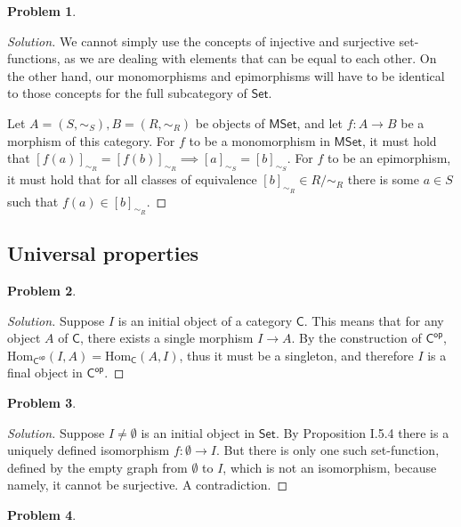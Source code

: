 \documentclass{article}
\theoremstyle{definition}
\newtheorem{problem-internal}{Problem}[subsection]
\newenvironment{problem}{
	\medskip
	\begin{problem-internal}
	}{
\end{problem-internal}
}
\newenvironment{solution}{
	\begin{proof}[Solution]
		\vspace{-8px}
		\setlength{\parskip}{4px}
		\setlength{\parindent}{0px}
	}{
\end{proof}
}
\newcommand{\Hom}{\mathrm{Hom}}
\newcommand{\C}{\mathsf{C}}
\newcommand{\Cop}{\mathsf{C^{op}}}
\newcommand{\Cset}{\mathsf{Set}}
\begin{document}
\begin{problem}
\end{problem}

\begin{solution}
	We cannot simply use the concepts of injective and surjective set-functions, as we are dealing with elements that can be equal to each other. On the other hand, our monomorphisms and epimorphisms will have to be identical to those concepts for the full subcategory of $\Cset$.
	
	Let $A = (S, \sim_S), B = (R, \sim_R)$ be objects of $\mathsf{MSet}$, and let $f: A \to B$ be a morphism of this category. For $f$ to be a monomorphism in $\mathsf{MSet}$, it must hold that $[f(a)]_{\sim_R} = [f(b)]_{\sim_R} \implies [a]_{\sim_S} = [b]_{\sim_S}$. For $f$ to be an epimorphism, it must hold that for all classes of equivalence $[b]_{\sim_R} \in R/\sim_R$ there is some $a \in S$ such that $f(a) \in [b]_{\sim_R}$.
\end{solution}

\subsection{Universal properties}

\begin{problem}
\end{problem}

\begin{solution}
	Suppose $I$ is an initial object of a category $\C$. This means that for any object $A$ of $\C$, there exists a single morphism $I \to A$. By the construction of $\Cop$, $\Hom_{\Cop}(I,A) = \Hom_{\C}(A,I)$, thus it must be a singleton, and therefore $I$ is a final object in $\Cop$.
\end{solution}

\begin{problem}
\end{problem}

\begin{solution}
	Suppose $I \neq \emptyset$ is an initial object in $\Cset$. By Proposition I.5.4 there is a uniquely defined isomorphism $f: \emptyset \to I$. But there is only one such set-function, defined by the empty graph from $\emptyset$ to $I$, which is not an isomorphism, because namely, it cannot be surjective. A contradiction.
\end{solution}

\begin{problem}
\end{problem}
\end{document}
